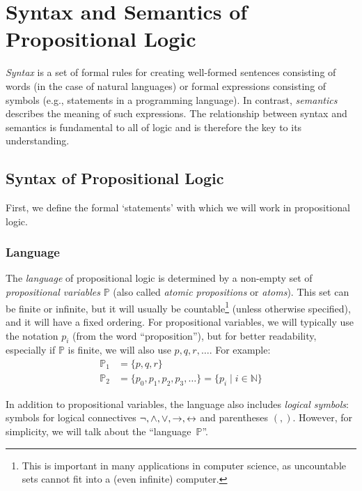 \chapter{Syntax and Semantics of Propositional Logic}

\emph{Syntax} is a set of formal rules for creating well-formed sentences consisting of words (in the case of natural languages) or formal expressions consisting of symbols (e.g., statements in a programming language). In contrast, \emph{semantics} describes the meaning of such expressions. The relationship between syntax and semantics is fundamental to all of logic and is therefore the key to its understanding.

\section{Syntax of Propositional Logic}

First, we define the formal `statements' with which we will work in propositional logic.

\subsection{Language}

The \emph{language} of propositional logic is determined by a non-empty set of \emph{propositional variables} \( \mathbb{P} \) (also called \emph{atomic propositions} or \emph{atoms}). This set can be finite or infinite, but it will usually be countable\footnote{This is important in many applications in computer science, as uncountable sets cannot fit into a (even infinite) computer.} (unless otherwise specified), and it will have a fixed ordering. For propositional variables, we will typically use the notation \( p_i \) (from the word ``proposition''), but for better readability, especially if \( \mathbb{P} \) is finite, we will also use \( p, q, r, \dots \). For example:
\begin{align*}
    \mathbb{P}_1 &= \{ p, q, r \} \\
    \mathbb{P}_2 &= \{ p_0, p_1, p_2, p_3, \ldots \} = \{ p_i \mid i \in \mathbb{N} \}
\end{align*}

In addition to propositional variables, the language also includes \emph{logical symbols}: symbols for logical connectives \( \neg, \land, \lor, \mathbin{\rightarrow}, \mathbin{\leftrightarrow} \) and parentheses \( (, ) \). However, for simplicity, we will talk about the ``language~\( \mathbb{P} \)''.

